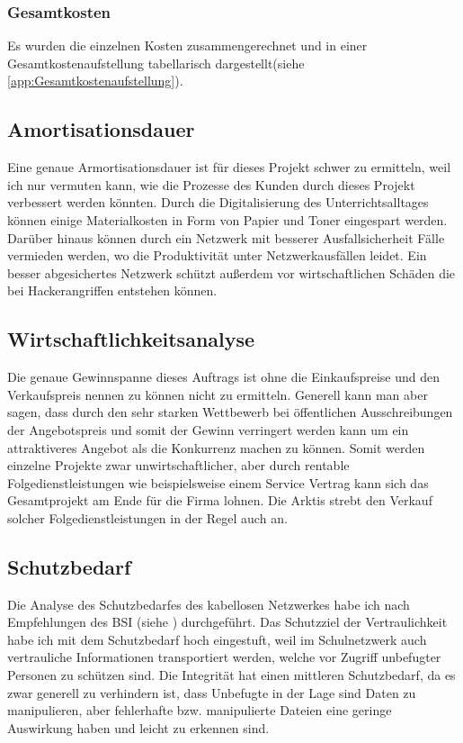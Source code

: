 \subsubsection{Gesamtkosten}
\label{app:Gesamtkosten}
Es wurden die einzelnen Kosten zusammengerechnet und in einer Gesamtkostenaufstellung tabellarisch dargestellt(siehe \ref{app:Gesamtkostenaufstellung}).

\subsection{Amortisationsdauer}
\label{sec:Amortisationsdauer}
Eine genaue Armortisationsdauer ist für dieses Projekt schwer zu ermitteln, weil ich nur vermuten kann, wie die Prozesse des Kunden durch dieses Projekt verbessert werden könnten. Durch die Digitalisierung des Unterrichtsalltages können einige Materialkosten in Form von Papier und Toner eingespart werden. Darüber hinaus können durch ein Netzwerk mit besserer Ausfallsicherheit Fälle vermieden werden, wo die Produktivität unter Netzwerkausfällen leidet. Ein besser abgesichertes Netzwerk schützt außerdem vor wirtschaftlichen Schäden die bei Hackerangriffen 
entstehen können. 

\subsection{Wirtschaftlichkeitsanalyse}
\label{sec:Wirtschaftlichkeitsanalyse}
Die genaue Gewinnspanne dieses Auftrags ist ohne die Einkaufspreise und den Verkaufspreis nennen zu können nicht zu ermitteln. Generell kann man aber sagen, dass durch den sehr starken Wettbewerb bei öffentlichen Ausschreibungen der Angebotspreis und somit der Gewinn verringert werden kann um ein attraktiveres Angebot als die Konkurrenz machen zu können. Somit werden einzelne Projekte zwar unwirtschaftlicher, aber durch rentable Folgedienstleistungen wie beispielsweise einem Service Vertrag kann sich das Gesamtprojekt am Ende für die Firma lohnen. Die \ac{Arktis} strebt den Verkauf solcher Folgedienstleistungen in der Regel auch an.

\subsection{Schutzbedarf}
\label{sec:Schutzbedarf}
Die Analyse des Schutzbedarfes des kabellosen Netzwerkes habe ich nach Empfehlungen des \ac{BSI} (siehe ) durchgeführt. Das Schutzziel der Vertraulichkeit habe ich mit dem Schutzbedarf hoch eingestuft, weil im Schulnetzwerk auch vertrauliche Informationen transportiert werden, welche vor Zugriff unbefugter Personen zu schützen sind. Die Integrität hat einen mittleren Schutzbedarf, da es zwar generell zu verhindern ist, dass Unbefugte in der Lage sind Daten zu manipulieren, aber fehlerhafte bzw. manipulierte Dateien eine geringe Auswirkung haben und leicht zu erkennen sind.


